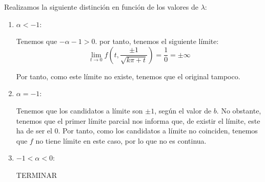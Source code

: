 \begin{ejercicio}
\begin{enumerate}
\begin{enumerate}
            Realizamos la siguiente distinción en función de los valores de $\lambda$:
            \begin{enumerate}
                \item $\alpha<-1$:

                Tenemos que $-\alpha-1>0$. por tanto, tenemos el siguiente límite:
                $$\lim\limits_{t\to 0} f\left(t,\frac{\pm 1}{\sqrt{k\pi + t}}\right)=\frac{1}{0}=\pm \infty$$

                Por tanto, como este límite no existe, tenemos que el original tampoco.

                \item $\alpha=-1$:
                
                Tenemos que los candidatos a límite son $\pm 1$, según el valor de $b$. No obstante, tenemos que el primer límite parcial nos informa que, de existir el límite, este ha de ser el 0. Por tanto, como los candidatos a límite no coinciden, tenemos que $f$ no tiene límite en este caso, por lo que no es continua.

                \item $-1<\alpha<0$:
                
                TERMINAR
            \end{enumerate}
        \end{enumerate}
    \end{enumerate}
\end{ejercicio}


